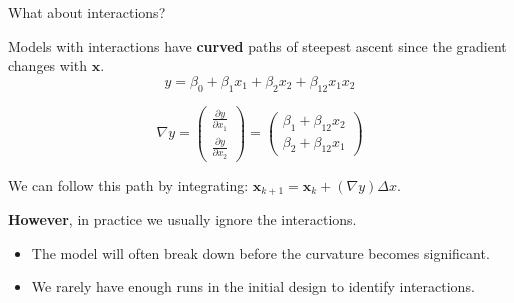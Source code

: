 \documentclass[10pt]{beamer}\usepackage[]{graphicx}\usepackage[]{color}
\begin{document}
\begin{frame}{What about interactions?}

Models with interactions have \textbf{curved} paths of steepest ascent since the gradient changes with $\boldsymbol{x}$.
\[ y = \beta_0 + \beta_1x_1 + \beta_2x_2 + \beta_{12}x_1x_2 \]

\[ \nabla y = \begin{pmatrix} \frac{\partial y}{\partial x_1} \\ \frac{\partial y}{\partial x_2} \end{pmatrix}
 = \begin{pmatrix} \beta_1 + \beta_{12}x_2 \\ \beta_2 + \beta_{12}x_1 \end{pmatrix} \]
 
 \pause
 We can follow this path by integrating: $\boldsymbol{x}_{k+1} = \boldsymbol{x}_k + (\nabla y)\Delta x$.

\pause
\bigskip
\textbf{However}, in practice we usually ignore the interactions.
\begin{itemize}
  \item The model will often break down before the curvature becomes significant.
  \item We rarely have enough runs in the initial design to identify interactions.
\end{itemize}

\end{frame}
\end{document}

